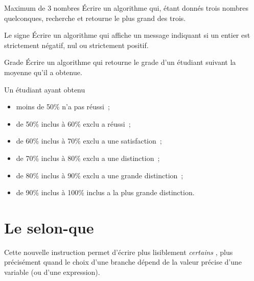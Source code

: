 		\begin{Exercice}{Maximum de 3 nombres}
			Écrire un algorithme qui, étant donnés trois nombres quelconques,
			recherche et retourne le plus grand des trois.
		\end{Exercice}
		
		\begin{Exercice}{Le signe}
			Écrire un algorithme qui affiche un message indiquant
			si un entier est strictement négatif, nul ou strictement
			positif.
		\end{Exercice}

		\begin{Exercice}{Grade}
			Écrire un algorithme qui retourne le grade d'un étudiant 
			suivant la moyenne qu'il a obtenue.
			
			Un étudiant ayant obtenu 
			\begin{itemize}
				\item moins de 50\% n'a pas réussi~;
				\item de 50\% inclus à 60\% exclu a réussi~;
				\item de 60\% inclus à 70\% exclu a une satisfaction~;
				\item de 70\% inclus à 80\% exclu a une distinction~;
				\item de 80\% inclus à 90\% exclu a une grande distinction~;
				\item de 90\% inclus à 100\% inclus a la plus grande distinction.
			\end{itemize}
		\end{Exercice}
	
\section{Le selon-que}

	Cette nouvelle instruction permet d'écrire plus lisiblement
	\emph{certains} ,
	plus précisément quand le choix d'une branche dépend
	de la valeur précise d'une variable
	(ou d'une expression).

